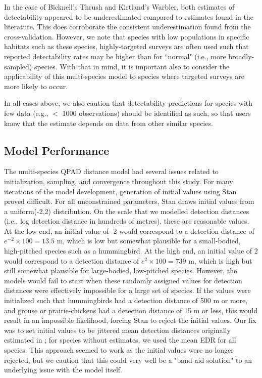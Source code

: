 \documentclass[12pt]{article}
\begin{document}
\par In the case of Bicknell's Thrush and Kirtland's Warbler, both estimates of detectability appeared to be underestimated compared to estimates found in the literature.
This does corroborate the consistent underestimation found from the cross-validation.
However, we note that species with low populations in specific habitats such as these species, highly-targeted surveys are often used such that reported detectability rates may be higher than for ``normal" (i.e., more broadly-sampled) species.
With that in mind, it is important also to consider the applicability of this multi-species model to species where targeted surveys are more likely to occur.

In all cases above, we also caution that detectability predictions for species with few data (e.g., $<$ 1000 observations) should be identified as such, so that users know that the estimate depends on data from other similar species.


\subsection{Model Performance}

\par The multi-species QPAD distance model had several issues related to initialization, sampling, and convergence throughout this study.
For many iterations of the model development, generation of initial values using Stan proved difficult.
For all unconstrained parameters, Stan draws initial values from a uniform(-2,2) distribution.
On the scale that we modelled detection distances (i.e., log detection distance in hundreds of metres), these are reasonable values.
At the low end, an initial value of -2 would correspond to a detection distance of $e^{-2} \times 100 = 13.5$ m, which is low but somewhat plausible for a small-bodied, high-pitched species such as a hummingbird.
At the high end, an initial value of 2 would correspond to a detection distance of $e^{2} \times 100 = 739$ m, which is high but still somewhat plausible for large-bodied, low-pitched species.
However, the models would fail to start when these randomly assigned values for detection distances were effectively impossible for a large set of species.
If the values were initialized such that hummingbirds had a detection distance of 500 m or more, and grouse or prairie-chickens had a detection distance of 15 m or less, this would result in an impossible likelihood, forcing Stan to reject the initial values.
Our fix was to set initial values to be jittered mean detection distances originally estimated in \citet{edwards_point_2023}; for species without estimates, we used the mean EDR for all species.
This approach seemed to work as the initial values were no longer rejected, but we caution that this could very well be a "band-aid solution" to an underlying issue with the model itself.
\end{document}
